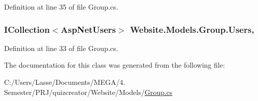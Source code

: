 Definition at line 35 of file Group.\+cs.

\hypertarget{class_website_1_1_models_1_1_group_ae3d094a974671a87a39d964b94c7c1aa}{}
\subsubsection[{Users}]{\setlength{\rightskip}{0pt plus 5cm}I\+Collection$<${\bf Asp\+Net\+Users}$>$ Website.\+Models.\+Group.\+Users\hspace{0.3cm}{\ttfamily [get]}, {\ttfamily [set]}}\label{class_website_1_1_models_1_1_group_ae3d094a974671a87a39d964b94c7c1aa}


Definition at line 33 of file Group.\+cs.



The documentation for this class was generated from the following file\+:\begin{DoxyCompactItemize}
\item 
C\+:/\+Users/\+Lasse/\+Documents/\+M\+E\+G\+A/4. Semester/\+P\+R\+J/quizcreator/\+Website/\+Models/\hyperlink{_group_8cs}{Group.\+cs}\end{DoxyCompactItemize}
